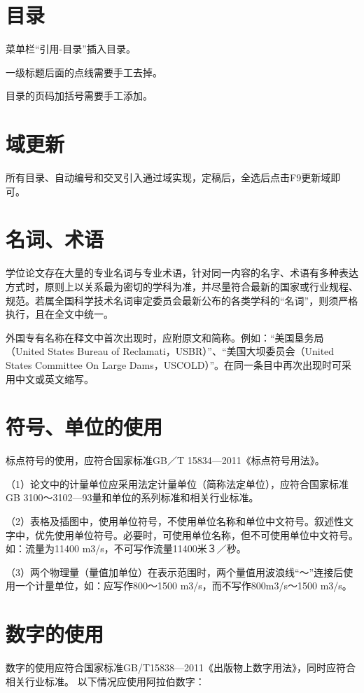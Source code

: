\section{目录}
菜单栏“引用-目录”插入目录。

一级标题后面的点线需要手工去掉。

目录的页码加括号需要手工添加。

\section{域更新}
所有目录、自动编号和交叉引入通过域实现，定稿后，全选后点击F9更新域即可。

\section{名词、术语}
学位论文存在大量的专业名词与专业术语，针对同一内容的名字、术语有多种表达方式时，原则上以关系最为密切的学科为准，并尽量符合最新的国家或行业规程、规范。若属全国科学技术名词审定委员会最新公布的各类学科的“名词”，则须严格执行，且在全文中统一。

外国专有名称在释文中首次出现时，应附原文和简称。例如：“美国垦务局（United States Bureau of Reclamati，USBR）”、“美国大坝委员会（United States Committee On Large Dams，USCOLD）”。在同一条目中再次出现时可采用中文或英文缩写。

\section{符号、单位的使用}
标点符号的使用，应符合国家标准GB／T 15834—2011《标点符号用法》。

（1）论文中的计量单位应采用法定计量单位（简称法定单位），应符合国家标准GB 3100～3102—93量和单位的系列标准和相关行业标准。

（2）表格及插图中，使用单位符号，不使用单位名称和单位中文符号。叙述性文字中，优先使用单位符号。必要时，可使用单位名称，但不可使用单位中文符号。如：流量为11400 m3/s，不可写作流量11400米３／秒。

（3）两个物理量（量值加单位）在表示范围时，两个量值用波浪线“～”连接后使用一个计量单位，如：应写作800～1500 m3/s，而不写作800m3/s～1500 m3/s。



\section{数字的使用}
数字的使用应符合国家标准GB/T15838—2011《出版物上数字用法》，同时应符合相关行业标准。
以下情况应使用阿拉伯数字：


